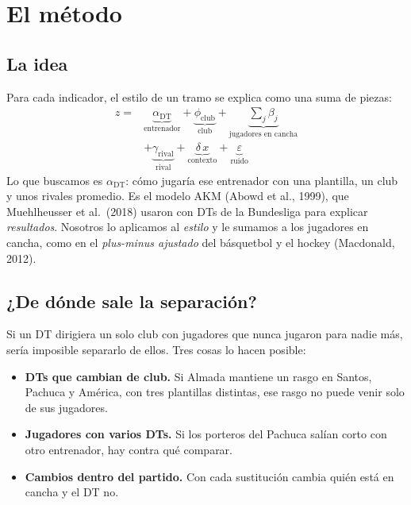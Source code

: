 \documentclass[10pt,a4paper,twocolumn]{article}
\begin{document}
\section{El método}
\subsection{La idea}
Para cada indicador, el estilo de un tramo se explica como una suma de piezas:
\begin{equation}
\begin{split}
z = {}& \underbrace{\alpha_{\text{DT}}}_{\text{entrenador}} + \underbrace{\phi_{\text{club}}}_{\text{club}} + \underbrace{\textstyle\sum_j \beta_j}_{\text{jugadores en cancha}} \\
&+ \underbrace{\gamma_{\text{rival}}}_{\text{rival}} + \underbrace{\delta\,x}_{\text{contexto}} + \underbrace{\varepsilon}_{\text{ruido}}
\end{split}
\label{eq:modelo}
\end{equation}
Lo que buscamos es $\alpha_{\text{DT}}$: cómo jugaría ese entrenador con una plantilla, un club y unos rivales promedio. Es el modelo AKM (Abowd et al., 1999), que Muehlheusser et al.\ (2018) usaron con DTs de la Bundesliga para explicar \emph{resultados}. Nosotros lo aplicamos al \emph{estilo} y le sumamos a los jugadores en cancha, como en el \emph{plus-minus ajustado} del básquetbol y el hockey (Macdonald, 2012).

\subsection{¿De dónde sale la separación?}
Si un DT dirigiera un solo club con jugadores que nunca jugaron para nadie más, sería imposible separarlo de ellos. Tres cosas lo hacen posible:
\begin{itemize}
\item \textbf{DTs que cambian de club.} Si Almada mantiene un rasgo en Santos, Pachuca y América, con tres plantillas distintas, ese rasgo no puede venir solo de sus jugadores.
\item \textbf{Jugadores con varios DTs.} Si los porteros del Pachuca salían corto con otro entrenador, hay contra qué comparar.
\item \textbf{Cambios dentro del partido.} Con cada sustitución cambia quién está en cancha y el DT no.
\end{itemize}
\end{document}

